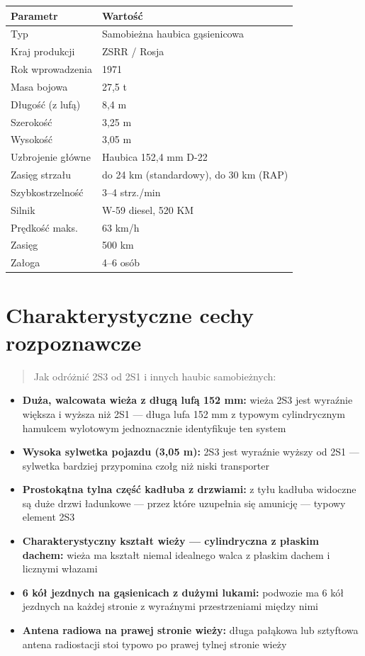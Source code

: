 \documentclass[12pt,openany,oneside]{book}
\providecommand{\tightlist}{%
  \setlength{\itemsep}{0pt}\setlength{\parskip}{0pt}}
\begin{document}
\begin{longtable}[]{@{}ll@{}}
\toprule\noalign{}
Parametr & Wartość \\
\midrule\noalign{}
\endhead
\bottomrule\noalign{}
\endlastfoot
Typ & Samobieżna haubica gąsienicowa \\
Kraj produkcji & ZSRR / Rosja \\
Rok wprowadzenia & 1971 \\
Masa bojowa & 27,5 t \\
Długość (z lufą) & 8,4 m \\
Szerokość & 3,25 m \\
Wysokość & 3,05 m \\
Uzbrojenie główne & Haubica 152,4 mm D-22 \\
Zasięg strzału & do 24 km (standardowy), do 30 km (RAP) \\
Szybkostrzelność & 3--4 strz./min \\
Silnik & W-59 diesel, 520 KM \\
Prędkość maks. & 63 km/h \\
Zasięg & 500 km \\
Załoga & 4--6 osób \\
\end{longtable}

\section{Charakterystyczne cechy
rozpoznawcze}\label{charakterystyczne-cechy-rozpoznawcze-10}

\begin{quote}
Jak odróżnić 2S3 od 2S1 i innych haubic samobieżnych:
\end{quote}

\begin{itemize}
\tightlist
\item
  \textbf{Duża, walcowata wieża z długą lufą 152 mm:} wieża 2S3 jest
  wyraźnie większa i wyższa niż 2S1 --- długa lufa 152 mm z typowym
  cylindrycznym hamulcem wylotowym jednoznacznie identyfikuje ten system
\item
  \textbf{Wysoka sylwetka pojazdu (3,05 m):} 2S3 jest wyraźnie wyższy od
  2S1 --- sylwetka bardziej przypomina czołg niż niski transporter
\item
  \textbf{Prostokątna tylna część kadłuba z drzwiami:} z tyłu kadłuba
  widoczne są duże drzwi ładunkowe --- przez które uzupełnia się
  amunicję --- typowy element 2S3
\item
  \textbf{Charakterystyczny kształt wieży --- cylindryczna z płaskim
  dachem:} wieża ma kształt niemal idealnego walca z płaskim dachem i
  licznymi włazami
\item
  \textbf{6 kół jezdnych na gąsienicach z dużymi lukami:} podwozie ma 6
  kół jezdnych na każdej stronie z wyraźnymi przestrzeniami między nimi
\item
  \textbf{Antena radiowa na prawej stronie wieży:} długa pałąkowa lub
  sztyftowa antena radiostacji stoi typowo po prawej tylnej stronie
  wieży
\end{itemize}
\end{document}
